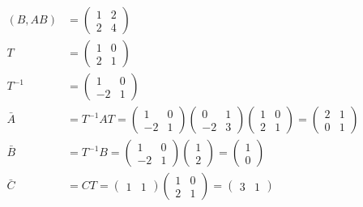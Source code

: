 \documentclass[a4paper,11pt,fleqn]{jreport}
\begin{document}
\begin{align*}
	(B, AB) 
	& =
	\left (
	\begin{array}{cc}
	 1 & 2\\ 
	 2 & 4
	\end{array}
	\right )
\\
	T
	&=
	\left (
	\begin{array}{cc}
	 1 & 0\\ 
	 2 & 1
	\end{array}
	\right )
\\
	T^{-1}
	&=
	\left (
	\begin{array}{cc}
	 1 & 0\\ 
	 -2 & 1
	\end{array}
	\right )
\\
	\bar{A} 
	&= 
	T^{-1} A T
	=
	\left (
	\begin{array}{cc}
	 1 & 0\\ 
	 -2 & 1
	\end{array}
	\right )
	\left (
	\begin{array}{cc}
	 0 & 1 \\
	 -2 & 3
	\end{array}
	\right )
	\left (
	\begin{array}{cc}
	 1 & 0\\ 
	 2 & 1
	\end{array}
	\right )
	=
	\left (
	\begin{array}{cc}
	 2 & 1\\ 
	 0 & 1
	\end{array}
	\right )
\\
	\bar{B}
	&=
	T^{-1}B
	=
	\left (
	\begin{array}{cc}
	 1 & 0\\ 
	 -2 & 1
	\end{array}
	\right )
	\left (
	\begin{array}{c}
	 1 \\ 2 
	\end{array}
	\right )
	=
	\left (
	\begin{array}{c}
	 1 \\ 0
	\end{array}
	\right )
\\
	\bar{C}
	&=
	C T
	=
	\left (
	\begin{array}{cc}
	 1 & 1  
	\end{array}
	\right )
	\left (
	\begin{array}{cc}
	 1 & 0\\ 
	 2 & 1
	\end{array}
	\right )
	=
	\left (
	\begin{array}{cc}
	 3 & 1  
	\end{array}
	\right )
\end{align*}
\end{document}
